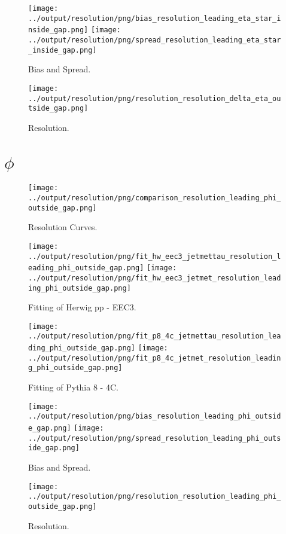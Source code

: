 \documentclass[11pt]{book}
\begin{document}
\begin{figure}[ht]
\centering
\texttt{[image: ../output/resolution/png/bias\_resolution\_leading\_eta\_star\_inside\_gap.png]}
\texttt{[image: ../output/resolution/png/spread\_resolution\_leading\_eta\_star\_inside\_gap.png]}
\caption{Bias and Spread.}
\end{figure}


\begin{figure}[ht]
\centering
\texttt{[image: ../output/resolution/png/resolution\_resolution\_delta\_eta\_outside\_gap.png]}
\caption{Resolution.}
\end{figure}
\clearpage

\section{$\phi$}

\begin{figure}[ht]
\centering
\texttt{[image: ../output/resolution/png/comparison\_resolution\_leading\_phi\_outside\_gap.png]}
\caption{Resolution Curves.}
\end{figure}


\begin{figure}[ht]
\centering
\texttt{[image: ../output/resolution/png/fit\_hw\_eec3\_jetmettau\_resolution\_leading\_phi\_outside\_gap.png]}
\texttt{[image: ../output/resolution/png/fit\_hw\_eec3\_jetmet\_resolution\_leading\_phi\_outside\_gap.png]}
\caption{Fitting of Herwig pp - EEC3.}
\end{figure}

\begin{figure}[ht]
\centering
\texttt{[image: ../output/resolution/png/fit\_p8\_4c\_jetmettau\_resolution\_leading\_phi\_outside\_gap.png]}
\texttt{[image: ../output/resolution/png/fit\_p8\_4c\_jetmet\_resolution\_leading\_phi\_outside\_gap.png]}
\caption{Fitting of Pythia 8 - 4C.}
\end{figure}

\begin{figure}[ht]
\centering
\texttt{[image: ../output/resolution/png/bias\_resolution\_leading\_phi\_outside\_gap.png]}
\texttt{[image: ../output/resolution/png/spread\_resolution\_leading\_phi\_outside\_gap.png]}
\caption{Bias and Spread.}
\end{figure}


\begin{figure}[ht]
\centering
\texttt{[image: ../output/resolution/png/resolution\_resolution\_leading\_phi\_outside\_gap.png]}
\caption{Resolution.}
\end{figure}
\clearpage
\end{document}
